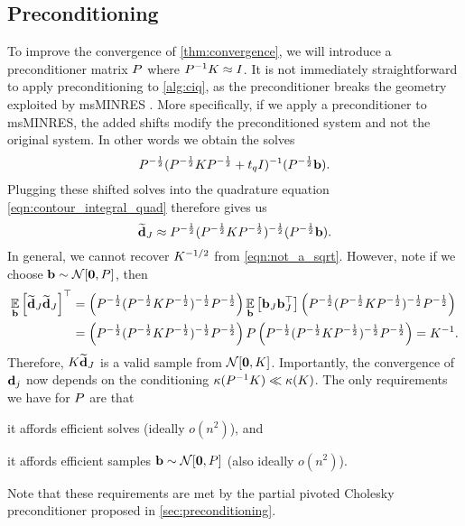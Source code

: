 \subsection{Preconditioning}
\label{sec:ciq_precond}

To improve the convergence of \cref{thm:convergence}, we will introduce a preconditioner matrix $P$ where $P^{-1} K \approx I$.
It is not immediately straightforward to apply preconditioning to \cref{alg:ciq}, as the preconditioner breaks the geometry exploited by msMINRES \cite{jegerlehner1996krylov,aune2013iterative}.
More specifically, if we apply a preconditioner to msMINRES, the added shifts modify the preconditioned system and not the original system.
In other words we obtain the solves
%
\begin{equation*}
	P^{-\frac 1 2} (P^{-\frac 1 2} K P^{-\frac 1 2} + t_q I)^{-1} (P^{-\frac 1 2} \mathbf{b}).
\end{equation*}
%
Plugging these shifted solves into the quadrature equation \cref{eqn:contour_integral_quad} therefore gives us
%
\begin{equation}
	\widetilde {\mathbf{d}}_J \approx P^{-\frac 1 2} (P^{-\frac 1 2} K P^{-\frac 1 2})^{-\frac 1 2} (P^{-\frac 1 2} \mathbf{b}).
  \label{eqn:not_a_sqrt}
\end{equation}
%
In general, we cannot recover $K^{-1/2}$ from \cref{eqn:not_a_sqrt}.
However, note if  we choose $\bb \sim \normaldist{\bzero}{\bP}$, then
%
\begin{align*}
	\operatorname*{\mathbb{E}}_{\mathbf{b}} \left[ \widetilde {\mathbf{d}}_J \widetilde {\mathbf{d}}_J \right]^\top
	&=
	\left( P^{-\frac 1 2} (P^{-\frac 1 2} K P^{-\frac 1 2})^{-\frac 1 2} P^{-\frac 1 2} \right)
	\operatorname*{\mathbb{E}}_{\mathbf{b}} \left[  \mathbf{b}_J \mathbf{b}_J^\top \right]
	\left( P^{-\frac 1 2} (P^{-\frac 1 2} K P^{-\frac 1 2})^{-\frac 1 2} P^{-\frac 1 2} \right)
	\\
	&=
	\left( P^{-\frac 1 2} (P^{-\frac 1 2} K P^{-\frac 1 2})^{-\frac 1 2} P^{-\frac 1 2} \right)
	P
	\left( P^{-\frac 1 2} (P^{-\frac 1 2} K P^{-\frac 1 2})^{-\frac 1 2} P^{-\frac 1 2} \right)
	=
	K^{-1}.
\end{align*}
%
Therefore, $K \widetilde {\mathbf{d}}_J$ is a valid sample from $\normaldist{\bzero}{\bK}$.
Importantly, the convergence of $\mathbf{d}_j$ now depends on the conditioning $\kappa(P^{-1} K) \ll \kappa(K)$.
The only requirements we have for $P$ are that
\begin{enumerate*}
	\item it affords efficient solves (ideally $o(n^2)$), and
	\item it affords efficient samples $\bb \sim \normaldist{\bzero}{\bP}$ (also ideally $o(n^2)$).
\end{enumerate*}
%
Note that these requirements are met by the partial pivoted Cholesky preconditioner proposed in \cref{sec:preconditioning}.

